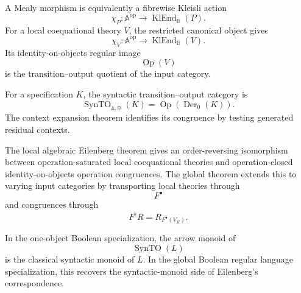 A Mealy morphism is equivalently a fibrewise Kleisli action
\[
    \chi_P:
    \mathbb A^{\mathrm{op}}
    \to
    \operatorname{KlEnd}_{\mathbb B}(P).
\]
For a local coequational theory \(V\), the restricted canonical object gives
\[
    \chi_V:
    \mathbb A^{\mathrm{op}}
    \to
    \operatorname{KlEnd}_{\mathbb B}(V).
\]
Its identity-on-objects regular image
\[
    \operatorname{Op}(V)
\]
is the transition--output quotient of the input category.

For a specification \(K\), the syntactic transition--output category is
\[
    \operatorname{SynTO}_{\mathbb A,\mathbb B}(K)
    =
    \operatorname{Op}(\operatorname{Der}_0(K)).
\]
The context expansion theorem identifies its congruence by testing generated
residual contexts.

The local algebraic Eilenberg theorem gives an order-reversing isomorphism
between operation-saturated local coequational theories and operation-closed
identity-on-objects operation congruences. The global theorem extends this to
varying input categories by transporting local theories through
\[
    F^\bullet
\]
and congruences through
\[
    F^\flat R=R_{F^\bullet(V_R)}.
\]

In the one-object Boolean specialization, the arrow monoid of
\[
    \operatorname{SynTO}(L)
\]
is the classical syntactic monoid of \(L\). In the global Boolean regular
language specialization, this recovers the syntactic-monoid side of
Eilenberg's correspondence.